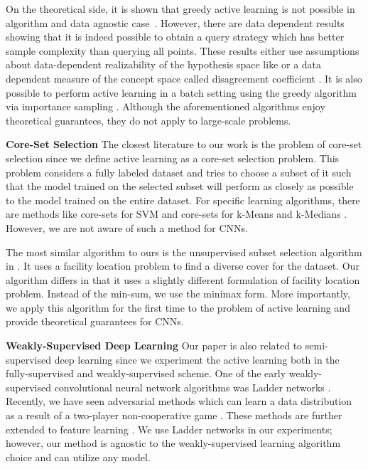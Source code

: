\documentclass{article} %
\begin{document}
On the theoretical side, it is shown that greedy active learning is not possible in algorithm and data agnostic case~\citep{NIPS2004_2636}. However, there are data dependent results showing that it is indeed possible to obtain a query strategy which has better sample complexity than querying all points. These results either use assumptions about data-dependent realizability of the hypothesis space like \citep{gonen2013efficient} or a data dependent measure of the concept space called disagreement coefficient \citep{hanneke2007bound}. It is also possible to perform active learning in a batch setting using the greedy algorithm via importance sampling \citep{ganti2012upal}. Although the aforementioned algorithms enjoy theoretical guarantees, they do not apply to large-scale problems.

\noindent\textbf{Core-Set Selection} The closest literature to our
work is the problem of core-set selection since we define active learning as a
core-set selection problem. This problem considers a
fully labeled dataset and tries to choose a subset of it such that the model
trained on the selected subset will perform as closely as possible to the model
trained on the entire dataset. For specific learning algorithms, there are
methods like core-sets for SVM \citep{tsang2005core} and core-sets for k-Means
and k-Medians \citep{har2005smaller,feldman0, feldman1,feldman2}. However, we are not aware of such a method for CNNs.

The most similar algorithm to ours is the unsupervised subset selection
algorithm in \citep{wei2013using}. It uses a facility location problem
to find a diverse cover for the dataset. Our algorithm differs in that it uses a
slightly different formulation of facility location problem. Instead of the
min-sum, we use the minimax \citep{facility} form. More
importantly, we apply this algorithm for the first time to the problem of active
learning and provide theoretical guarantees for CNNs.
 
\noindent\textbf{Weakly-Supervised Deep Learning} Our paper is also related to
semi-supervised deep learning since we experiment the active learning both in
the fully-supervised and weakly-supervised scheme. One of the early
weakly-supervised convolutional neural network algorithms was Ladder networks
\citep{ladder}. Recently, we have seen adversarial methods which can learn a data
distribution as a result of a two-player non-cooperative game
\citep{salimans2016improved, gan_original, dcgan}. These methods are further
extended to feature learning \citep{ali, bigan}. We use Ladder networks in our
experiments; however, our method is agnostic to the weakly-supervised learning algorithm choice and can
utilize any model.
\end{document}
